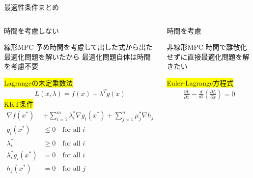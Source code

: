 \documentclass[dvipdfmx,12pt]{beamer}
\begin{document}
    \begin{frame}{最適性条件まとめ}
        \fontsize{6.5pt}{6.5pt}\selectfont
        
        \begin{columns}
            \begin{column}{.6\textwidth}
                \begin{itembox}[l]{時間を考慮しない}
                    \begin{itembox}[l]{線形MPC}
                        予め時間を考慮して出した式から出た最適化問題を解いたから
                        最適化問題自体は時間を考慮不要\\
                    \end{itembox}
                    \colorbox{yellow}{Lagrangeの未定乗数法}\\
                    \begin{align*}
                        L(x, \lambda) = f(x) + \lambda^T g(x)
                    \end{align*}
                    \colorbox{yellow}{KKT条件}\\
                    \begin{align*}
                        \nabla f(x^*) &+ \sum_{i=1}^m \lambda_i^* \nabla g_i(x^*) + \sum_{j=1}^n \mu_j^* \nabla h_j(x^*) = 0 \\
                        g_i(x^*) &\leq 0 \quad \text{for all } i \\
                        \lambda_i^* &\geq 0 \quad \text{for all } i \\
                        \lambda_i^* g_i(x^*) &= 0 \quad \text{for all } i \\
                        h_j(x^*) &= 0 \quad \text{for all } j
                    \end{align*}
                \end{itembox}
            \end{column}

            \begin{column}{.55\textwidth}
                \begin{itembox}[l]{時間を考慮}
                    \begin{itembox}[l]{非線形MPC}
                        時間で離散化せずに直接最適化問題を解きたい
                    \end{itembox}
                    \colorbox{yellow}{Euler-Lagrange方程式}\\
                    \begin{align*}
                        \frac{\partial L}{\partial x} - \frac{d}{dt} \left( \frac{\partial L}{\partial \dot{x}} \right) = 0
                    \end{align*}
                \end{itembox}
            \end{column}
        \end{columns}
    \end{frame}
\end{document}
